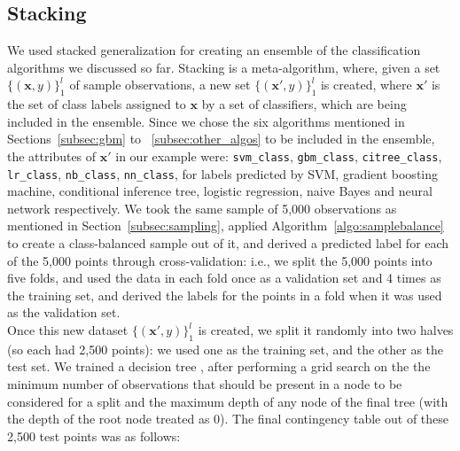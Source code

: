 \subsection{Stacking}
\label{subsec:stacking}
We used stacked generalization \cite{Wolpert92} for creating an ensemble of the classification algorithms we discussed so far. Stacking is a meta-algorithm, where, given a set $\{(\mathbf{x}, y)\}_1^l$ of sample observations, a new set $\{({\mathbf{x}}', y)\}_1^l$ is created, where ${\mathbf{x}}'$ is the set of class labels assigned to $\mathbf{x}$ by a set of classifiers, which are being included in the ensemble. Since we chose the six algorithms mentioned in Sections~\ref{subsec:gbm} to ~\ref{subsec:other_algos} to be included in the ensemble, the attributes of ${\mathbf{x}}'$ in our example were: \texttt{svm\_class},  \texttt{gbm\_class}, \texttt{citree\_class}, \texttt{lr\_class}, \texttt{nb\_class}, \texttt{nn\_class}, for labels predicted by SVM, gradient boosting machine, conditional inference tree, logistic regression, naive Bayes and neural network respectively. We took the same sample of 5,000 observations as mentioned in Section~\ref{subsec:sampling}, applied Algorithm~\ref{algo:samplebalance} to create a class-balanced sample out of it, and derived a predicted label for each of the 5,000 points through cross-validation: i.e., we split the 5,000 points into five folds, and used the data in each fold once as a validation set and 4 times as the training set, and derived the labels for the points in a fold when it was used as the validation set.\\

Once this new dataset $\{({\mathbf{x}}', y)\}_1^l$ is created, we split it randomly into two halves (so each had 2,500 points): we used one as the training set, and the other as the test set. We trained a decision tree \cite{rpart}, after performing a grid search on the the minimum number of observations that should be present in a node to be considered for a split and the maximum depth of any node of the final tree (with the depth of the root node treated as 0). The final contingency table out of these 2,500 test points was as follows:


